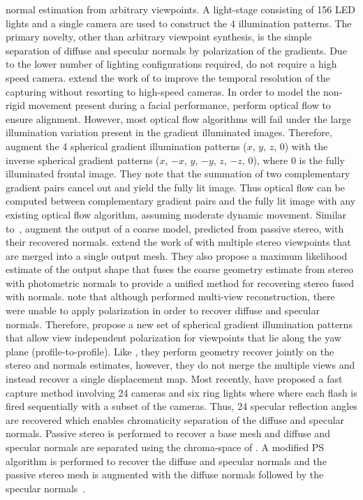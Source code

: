 normal estimation from arbitrary viewpoints. A light-stage consisting of 156
LED lights and a single camera are used to construct the 4 illumination 
patterns. The primary novelty, other than arbitrary viewpoint synthesis, is
the simple separation of diffuse and specular normals by polarization of the 
gradients. Due to the lower number of lighting configurations required,
\citet{ma2007rapid} do not require a high speed camera. 
\citet{wilson2010temporal} extend the work of \citet{ma2007rapid} to
improve the temporal resolution of the capturing without resorting to
high-speed cameras. In order to model the non-rigid movement present
during a facial performance, \citet{wilson2010temporal} perform optical
flow to ensure alignment. However, most optical flow algorithms will fail under
the large illumination variation present in the gradient illuminated images.
Therefore, \citet{wilson2010temporal} augment the 4 spherical gradient
illumination patterns ($x$, $y$, $z$, $0$) with the inverse spherical
gradient patterns ($x$, $-x$, $y$, $-y$, $z$, $-z$, $0$), where $0$ is the
fully illuminated frontal image. They note that the summation of two
complementary gradient pairs cancel out and yield the fully lit image. Thus
optical flow can be computed between complementary gradient pairs and the fully
lit image with any existing optical flow algorithm, assuming moderate dynamic
movement. Similar to~\cite{ma2007rapid,debevec2000acquiring,weyrich2006analysis},
\citet{wilson2010temporal} augment the output of a coarse model, predicted
from passive stereo, with their recovered normals. 
\citet{fyffe2011comprehensive} extend the work of \citet{wilson2010temporal}
with multiple stereo viewpoints that are merged into a single output mesh.
They also propose a maximum likelihood estimate of the output shape
that fuses the coarse geometry estimate from stereo with photometric normals
to provide a unified method for recovering stereo fused with normals.
\citet{ghosh2011multiview} note that although \citet{fyffe2011comprehensive} 
performed multi-view reconstruction, there were unable to apply polarization
in order to recover diffuse and specular normals. Therefore, 
\citet{ghosh2011multiview} propose a new set of spherical gradient
illumination patterns that allow view independent polarization
for viewpoints that lie along the yaw plane (profile-to-profile). Like
\citet{fyffe2011comprehensive}, they perform geometry recover jointly
on the stereo and normals estimates, however, they do not merge the multiple
views and instead recover a single displacement map. Most recently,
\citet{graham2015near} have proposed a fast capture method involving 24 cameras
and six ring lights where where each flash is fired sequentially with a subset
of the cameras. Thus, 24 specular reflection angles are recovered which
enables chromaticity separation of the diffuse and specular normals. Passive
stereo is performed to recover a base mesh and diffuse and specular normals
are separated using the chroma-space of \citet{zickler2008color}. A modified
PS algorithm is performed to recover the diffuse and specular normals and
the passive stereo mesh is augmented with the diffuse normals followed
by the specular normals~\cite{nehab2005efficiently}.

